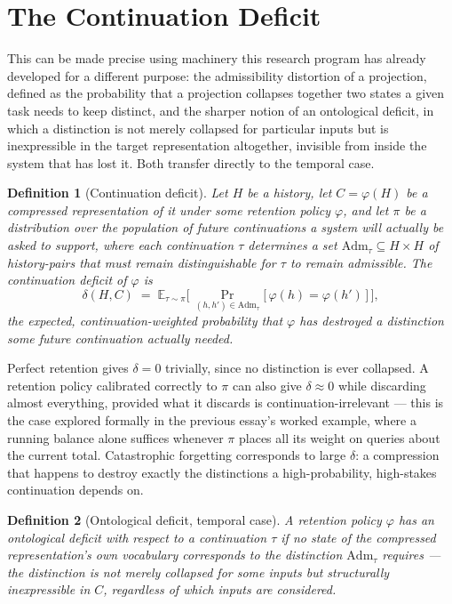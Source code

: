\documentclass[11pt]{article}
\newtheorem{definition}{Definition}
\begin{document}
\section{The Continuation Deficit}

This can be made precise using machinery this research program has already developed for a different purpose: the admissibility distortion of a projection, defined as the probability that a projection collapses together two states a given task needs to keep distinct, and the sharper notion of an ontological deficit, in which a distinction is not merely collapsed for particular inputs but is inexpressible in the target representation altogether, invisible from inside the system that has lost it. Both transfer directly to the temporal case.

\begin{definition}[Continuation deficit]
Let $H$ be a history, let $C = \varphi(H)$ be a compressed representation of it under some retention policy $\varphi$, and let $\pi$ be a distribution over the population of future continuations a system will actually be asked to support, where each continuation $\tau$ determines a set $\mathrm{Adm}_\tau \subseteq H \times H$ of history-pairs that must remain distinguishable for $\tau$ to remain admissible. The continuation deficit of $\varphi$ is
\[
\delta(H, C) \;=\; \mathbb{E}_{\tau \sim \pi}\Big[\, \Pr_{(h, h') \in \mathrm{Adm}_\tau}\big[\, \varphi(h) = \varphi(h') \,\big] \,\Big],
\]
the expected, continuation-weighted probability that $\varphi$ has destroyed a distinction some future continuation actually needed.
\end{definition}

Perfect retention gives $\delta = 0$ trivially, since no distinction is ever collapsed. A retention policy calibrated correctly to $\pi$ can also give $\delta \approx 0$ while discarding almost everything, provided what it discards is continuation-irrelevant --- this is the case explored formally in the previous essay's worked example, where a running balance alone suffices whenever $\pi$ places all its weight on queries about the current total. Catastrophic forgetting corresponds to large $\delta$: a compression that happens to destroy exactly the distinctions a high-probability, high-stakes continuation depends on.

\begin{definition}[Ontological deficit, temporal case]
A retention policy $\varphi$ has an ontological deficit with respect to a continuation $\tau$ if no state of the compressed representation's own vocabulary corresponds to the distinction $\mathrm{Adm}_\tau$ requires --- the distinction is not merely collapsed for some inputs but structurally inexpressible in $C$, regardless of which inputs are considered.
\end{definition}
\end{document}
